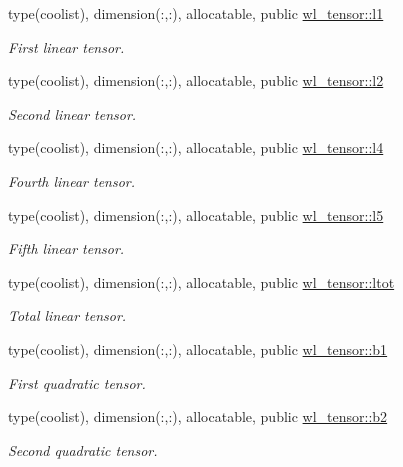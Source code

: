 \begin{DoxyCompactItemize}
type(coolist), dimension(\+:,\+:), allocatable, public \hyperlink{namespacewl__tensor_aa309444c23a52a0e43329bf59cef9b4a}{wl\+\_\+tensor\+::l1}
\begin{DoxyCompactList}\small\item\em First linear tensor. \end{DoxyCompactList}\item 
type(coolist), dimension(\+:,\+:), allocatable, public \hyperlink{namespacewl__tensor_aa4f45dfb65512833eea93c9c49ca94e1}{wl\+\_\+tensor\+::l2}
\begin{DoxyCompactList}\small\item\em Second linear tensor. \end{DoxyCompactList}\item 
type(coolist), dimension(\+:,\+:), allocatable, public \hyperlink{namespacewl__tensor_ad4231065a820c662308e0bfb85e58bf1}{wl\+\_\+tensor\+::l4}
\begin{DoxyCompactList}\small\item\em Fourth linear tensor. \end{DoxyCompactList}\item 
type(coolist), dimension(\+:,\+:), allocatable, public \hyperlink{namespacewl__tensor_a3205f1dbfef2da92755dbff79dbe05d5}{wl\+\_\+tensor\+::l5}
\begin{DoxyCompactList}\small\item\em Fifth linear tensor. \end{DoxyCompactList}\item 
type(coolist), dimension(\+:,\+:), allocatable, public \hyperlink{namespacewl__tensor_afd79a2a5beca62333d1b791582c848d1}{wl\+\_\+tensor\+::ltot}
\begin{DoxyCompactList}\small\item\em Total linear tensor. \end{DoxyCompactList}\item 
type(coolist), dimension(\+:,\+:), allocatable, public \hyperlink{namespacewl__tensor_a6ffcc1305329bf3f57ab21e715172613}{wl\+\_\+tensor\+::b1}
\begin{DoxyCompactList}\small\item\em First quadratic tensor. \end{DoxyCompactList}\item 
type(coolist), dimension(\+:,\+:), allocatable, public \hyperlink{namespacewl__tensor_a297e5f32373d65ccaeaba0c5b00fb27c}{wl\+\_\+tensor\+::b2}
\begin{DoxyCompactList}\small\item\em Second quadratic tensor. \end{DoxyCompactList}\item 

\end{DoxyCompactItemize}
